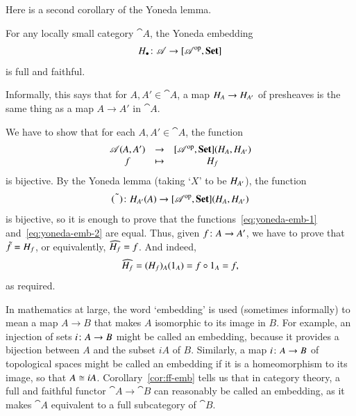 %
%

Here is a second corollary of the Yoneda lemma.

\begin{cor}
\label{cor:yoneda-ff}
For any locally small category $\cat{A}$, the Yoneda embedding
\[
\h_\bl\from \cat{A} \to \pshf{\cat{A}}
\]
is full and faithful.
\end{cor}

Informally, this says that for $A, A' \in \cat{A}$, a map $H_A \to H_{A'}$ of
presheaves is the same thing as a map $A \to A'$ in $\cat{A}$.

\begin{pf}
We have to show that for each $A, A' \in \cat{A}$, the function
%
\begin{equation}
\label{eq:yoneda-emb-1}
\begin{array}{ccc}
\mathscr{A}(A, A')  &\to            &[\mathscr{A}^{\mathrm{op}},\mathbf{Set}](H_A, H_{A'})    \\
f               &\mapsto        &H_f
\end{array}
\end{equation}
%
is bijective.  By the Yoneda lemma (taking `$X$' to be $H_{A'}$), the function
%
\begin{equation}
\label{eq:yoneda-emb-2}
\ynt{\blank}\from
\h_{A'}(A) \to \pshf{\cat{A}}(\h_A, \h_{A'})
\end{equation}
%
is bijective, so it is enough to prove that the
functions~\eqref{eq:yoneda-emb-1} and~\eqref{eq:yoneda-emb-2} are equal.
Thus, given $f\from A \to A'$, we have to prove that $\tilde{f} = H_f$, or
equivalently, $\widehat{H_f} = f$.  And indeed,
\[
\widehat{H_f}
=
(H_f)_A(1_A)
=
f \mathbin{\circ} 1_A
=
f,
\]
as required.
\end{pf}

In mathematics at large, the word `embedding'%
%
%
is used (sometimes informally) to mean a map $A \to B$ that makes $A$
isomorphic to its image in $B$.  For example, an injection of sets $i\from
A \to B$ might be called an embedding, because it provides a bijection
between $A$ and the subset $iA$ of $B$.  Similarly, a map $i\from A \to B$
of topological spaces might be called an embedding if it is a homeomorphism
to its image, so that $A \cong iA$.  Corollary~\ref{cor:ff-emb} tells us
that in category theory, a full and faithful functor $\cat{A} \to \cat{B}$
can reasonably be called an embedding, as it makes $\cat{A}$ equivalent to
a full subcategory of $\cat{B}$.

